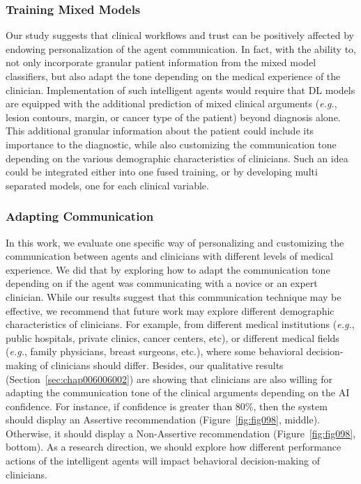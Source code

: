 \subsubsection{Training Mixed Models}
\label{sec:chap006007001002}

Our study suggests that clinical workflows and trust can be positively affected by endowing personalization of the agent communication.
In fact, with the ability to, not only incorporate granular patient information from the mixed model classifiers, but also adapt the tone depending on the medical experience of the clinician.
Implementation of such intelligent agents would require that DL models are equipped with the additional prediction of mixed clinical arguments ({\it e.g.}, lesion contours, margin, or cancer type of the patient) beyond diagnosis alone.
This additional granular information about the patient could include its importance to the diagnostic, while also customizing the communication tone depending on the various demographic characteristics of clinicians.
Such an idea could be integrated either into one fused training, or by developing multi separated models, one for each clinical variable.

\subsubsection{Adapting Communication}
\label{sec:chap006007001003}

In this work, we evaluate one specific way of personalizing and customizing the communication between agents and clinicians with different levels of medical experience.
We did that by exploring how to adapt the communication tone depending on if the agent was communicating with a novice or an expert clinician.
While our results suggest that this communication technique may be effective, we recommend that future work may explore different demographic characteristics of clinicians.
For example, from different medical institutions ({\it e.g.}, public hospitals, private clinics, cancer centers, etc), or different medical fields ({\it e.g.}, family physicians, breast surgeons, etc.), where some behavioral decision-making of clinicians should differ.
Besides, our qualitative results (Section~\ref{sec:chap006006002}) are showing that clinicians are also willing for adapting the communication tone of the clinical arguments depending on the AI confidence.
For instance, if confidence is greater than 80\%, then the system should display an Assertive recommendation (Figure~\ref{fig:fig098}, middle).
Otherwise, it should display a Non-Assertive recommendation (Figure~\ref{fig:fig098}, bottom).
As a research direction, we should explore how different performance actions of the intelligent agents will impact behavioral decision-making of clinicians.


